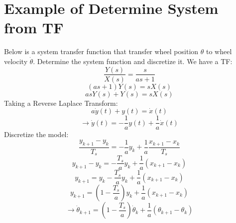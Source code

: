 \section{Example of Determine System from TF}
Below is a system transfer function that transfer wheel position $\theta$ to wheel velocity $\dot{\theta}$. Determine the system function and discretize it.
We have a TF:
\[\frac{Y(s)}{X(s)} = \frac{s}{as + 1}\]
\[(as + 1)Y(s) = sX(s)\]
\[asY(s) + Y(s) = sX(s)\]
Taking a Reverse Laplace Transform:
\[a\dot{y}(t) + y(t) = \dot{x}(t)\]
\[\rightarrow \boxed{\dot{y}(t) = -\frac{1}{a}y(t) + \frac{1}{a}\dot{x}(t)}\]
Discretize the model:
\[\frac{y_{k+1}- y_k}{T_s} = -\frac{1}{a}y_k + \frac{1}{a}\frac{x_{k+1}- x_k}{T_s}\]
\[y_{k+1}- y_k = -\frac{T_s}{a}y_k + \frac{1}{a}(x_{k+1}- x_k)\]
\[y_{k+1} = y_k - \frac{T_s}{a}y_k + \frac{1}{a}(x_{k+1}- x_k)\]
\[y_{k+1} = (1- \frac{T_s}{a})y_k + \frac{1}{a}(x_{k+1}- x_k)\]
\[\rightarrow \boxed{\dot{\theta}_{k+1} = (1- \frac{T_s}{a})\dot{\theta}_k + \frac{1}{a}(\theta_{k+1}- \theta_k)}\]